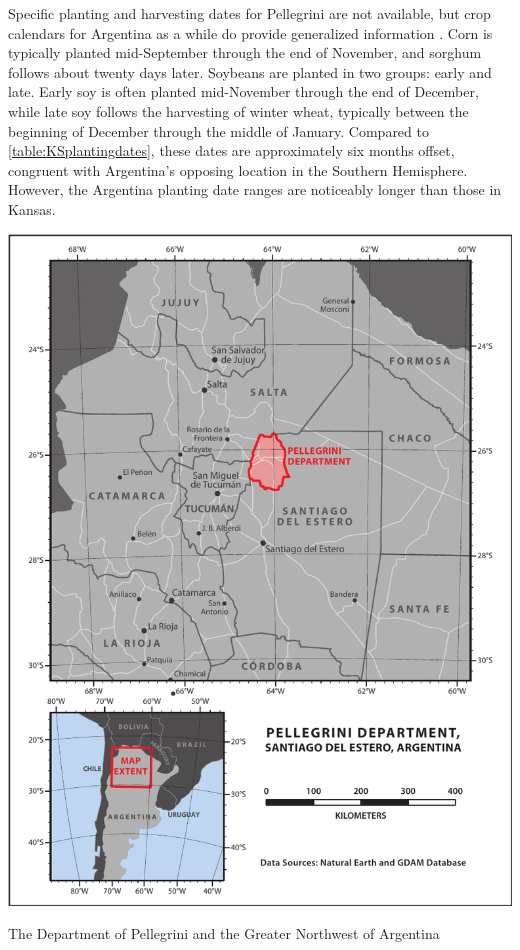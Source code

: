 Specific planting and harvesting dates for Pellegrini are not available, but crop calendars for Argentina as a while do provide generalized information \autocites{agriculture-for2008foreign}{sacks2010crop}{soybean-and-cor2013argentina}. Corn is typically planted mid-September through the end of November, and sorghum follows about twenty days later. Soybeans are planted in two groups: early and late. Early soy is often planted mid-November through the end of December, while late soy follows the harvesting of winter wheat, typically between the beginning of December through the middle of January. Compared to \autoref{table:KSplantingdates}, these dates are approximately six months offset, congruent with Argentina's opposing location in the Southern Hemisphere. However, the Argentina planting date ranges are noticeably longer than those in Kansas.


\begin{ssfigure}
  \centering
  \includegraphics[width=\textwidth]{Graphics/argentinaOverview.pdf}
  \caption{The Department of Pellegrini and the Greater Northwest of Argentina}
  \label{map:argentinaOverview}
\end{ssfigure}

